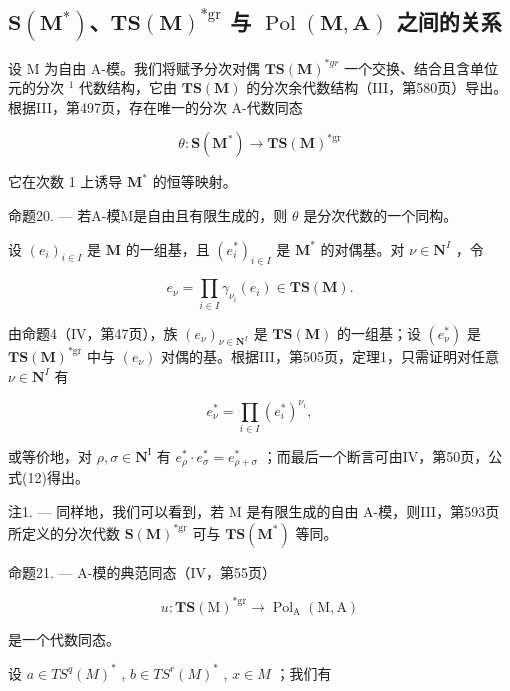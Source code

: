 \subsection{\texorpdfstring{\(\mathbf{S}(\mathbf{M}^{*})\)、\(\mathbf{TS}(\mathbf{M})^{*\mathrm{gr}}\) 与 \(\operatorname{Pol}(\mathbf{M}, \mathbf{A})\) 之间的关系}{S(M*)、TS(M) 的分次对偶与 Pol(M, A) 之间的关系}}

设 M 为自由 A-模。我们将赋予分次对偶 \(\mathbf{TS}(\mathbf{M})^{*gr}\) 一个交换、结合且含单位元的分次 \(^{1}\) 代数结构，它由 \(\mathbf{TS}(\mathbf{M})\) 的分次余代数结构（III，第580页）导出。根据III，第497页，存在唯一的分次 A-代数同态

\[
\theta : \mathbf {S} (\mathbf {M} ^ {*}) \rightarrow \mathbf {T S} (\mathbf {M}) ^ {* \mathrm{gr}}
\]

它在次数 1 上诱导 \(\mathbf{M}^*\) 的恒等映射。

命题20. --- 若A-模M是自由且有限生成的，则 \(\theta\) 是分次代数的一个同构。

设 \((e_i)_{i\in I}\) 是 \(\mathbf{M}\) 的一组基，且 \((e_i^*)_{i\in I}\) 是 \(\mathbf{M}^*\) 的对偶基。对 \(\nu \in \mathbf{N}^I\) ，令

\[
e _ {\nu} = \prod_ {i \in I} \gamma_ {\nu_ {i}} (e _ {i}) \in \mathbf {T S} (\mathbf {M}).
\]

由命题4（IV，第47页），族 \((e_{\nu})_{\nu \in \mathbf{N}^{I}}\) 是 \(\mathbf{TS}(\mathbf{M})\) 的一组基；设 \((e_{\nu}^{*})\) 是 \(\mathbf{TS}(\mathbf{M})^{*\mathrm{gr}}\) 中与 \((e_{\nu})\) 对偶的基。根据III，第505页，定理1，只需证明对任意 \(\nu \in \mathbf{N}^{I}\) 有

\[
e _ {\nu} ^ {*} = \prod_ {i \in I} \left(e _ {i} ^ {*}\right) ^ {\nu_ {i}},
\]

或等价地，对 \(\rho, \sigma \in \mathbf{N}^{\mathrm{I}}\) 有 \(e_{\rho}^{*} \cdot e_{\sigma}^{*} = e_{\rho + \sigma}^{*}\) ；而最后一个断言可由IV，第50页，公式(12)得出。

注1. --- 同样地，我们可以看到，若 M 是有限生成的自由 A-模，则III，第593页所定义的分次代数 \(\mathbf{S}(\mathbf{M})^{*\mathrm{gr}}\) 可与 \(\mathbf{TS}(\mathbf{M}^*)\) 等同。

命题21. --- A-模的典范同态（IV，第55页）

\[
u: \mathbf {T S} (\mathrm{M}) ^ {* \mathrm{gr}} \rightarrow \operatorname{Pol} _ {\mathrm{A}} (\mathrm{M}, \mathrm{A})
\]

是一个代数同态。

设 \(a \in TS^{q}(M)^{*}\) , \(b \in TS^{r}(M)^{*}\) , \(x \in M\) ；我们有

